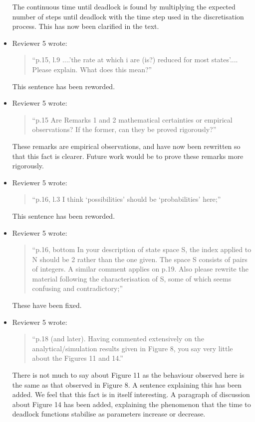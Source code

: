 \documentclass{article}
\begin{document}
\begin{itemize}
The continuous time until deadlock is found by multiplying the expected number
of steps until deadlock with the time step used in the discretisation process.
This has now been clarified in the text.

\item Reviewer 5 wrote:
\begin{quote}
``p.15, l.9 ....’the rate at which i are (is?) reduced for most states’....
Please explain. What does this mean?''
\end{quote}

This sentence has been reworded.


\item Reviewer 5 wrote:
\begin{quote}
``p.15 Are Remarks 1 and 2 mathematical certainties or empirical observations?
If the former, can they be proved rigorously?''
\end{quote}

These remarks are empirical observations, and have now been rewritten so that
this fact is clearer. Future work would be to prove these remarks more
rigorously.

\item Reviewer 5 wrote:
\begin{quote}
``p.16, l.3 I think ‘possibilities’ should be ‘probabilities’ here;''
\end{quote}

This sentence has been reworded.


\item Reviewer 5 wrote:
\begin{quote}
``p.16, bottom In your description of state space S, the index applied to N
should be 2 rather than the one given. The space S consists of pairs of
integers. A similar comment applies on p.19. Also please rewrite the material
following the characterisation of S, some of which seems confusing and
contradictory;''
\end{quote}

These have been fixed.


\item Reviewer 5 wrote:
\begin{quote}
``p.18 (and later). Having commented extensively on the analytical/simulation
results given in Figure 8, you say very little about the Figures 11 and 14.''
\end{quote}

There is not much to say about Figure 11 as the behaviour observed here is the
same as that observed in Figure 8. A sentence explaining this has been added.
We feel that this fact is in itself interesting.
A paragraph of discussion about Figure 14 has been added, explaining the
phenomenon that the time to deadlock functions stabilise as parameters
increase or decrease.


\end{itemize}
\end{document}
